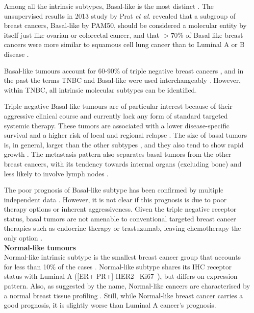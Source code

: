 Among all the intrinsic subtypes, Basal-like is the most distinct \cite{TCGAComprehensiveTumors}. The unsupervised results in 2013 study by Prat \textit{et al.} \cite{prat2013genomic}  revealed that a subgroup of breast cancers, Basal-like by PAM50, should be considered a molecular entity by itself just like ovarian or colorectal cancer, and that $>70\%$ of Basal-like breast cancers were more similar to squamous cell lung cancer than to Luminal A or B disease \cite{prat2013genomic}. 

Basal-like tumours account for 60-90\% of triple negative breast cancers \cite{fan2006concordance}, and in the past the terms TNBC and Basal-like were used interchangeably \cite{Vidal2017}. However, within TNBC, all intrinsic molecular subtypes can be identified. 

Triple negative Basal-like tumours are of particular interest because of their aggressive clinical course and currently lack any form of standard targeted systemic therapy. These tumors are associated with a lower disease-specific survival and a higher risk of local and regional relapse \cite{hudis2011triple}. 
The size of basal tumors is, in general, larger than the other subtypes \cite{rakha2006morphological}, and they also tend to show rapid growth \cite{ho2012characterization}. The metastasis pattern also separates basal tumors from the other breast cancers, with its tendency towards internal organs (excluding bone) and less likely to involve lymph nodes \cite{ho2012characterization}. 

The poor prognosis of Basal-like subtype  has been confirmed by multiple independent data \cite{brenton2005molecular}. However, it is not clear if this prognosis is due to poor therapy options or inherent aggressiveness. Given the triple negative receptor status,  basal tumors are not amenable to conventional targeted breast cancer therapies such as endocrine therapy or trastuzumab, leaving chemotherapy the only option \cite{brenton2005molecular, Dai2015}. \\


\textbf{Normal-like tumours }\\
Normal-like intrinsic subtype is the smallest breast cancer group that accounts for less than 10\% of the cases \cite{Dai2015}. Normal-like subtype shares its IHC receptor status with Luminal A ([ER+ PR+] HER2-- Ki67--), but differs on expression pattern. Also, as suggested by the name, Normal-like cancers are characterised by a normal breast tissue profiling \cite{perou2000molecular}. Still, while Normal-like breast cancer carries a good prognosis, it is slightly worse than Luminal A cancer’s prognosis.\\




























